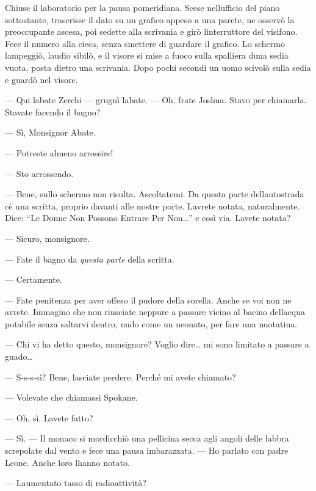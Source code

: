 	Chiuse il laboratorio per la pausa pomeridiana. Scese
	nell\textquotesingle ufficio del piano sottostante, trascrisse il dato
	su un grafico appeso a una parete, ne osservò la preoccupante ascesa,
	poi sedette alla scrivania e girò l\textquotesingle interruttore del
	visifono. Fece il numero alla cieca, senza smettere di guardare il
	grafico. Lo schermo lampeggiò, l\textquotesingle audio sibilò, e il
	visore si mise a fuoco sulla spalliera d\textquotesingle una sedia
	vuota, posta dietro una scrivania. Dopo pochi secondi un uomo scivolò
	sulla sedia e guardò nel visore.
	
	--- Qui l\textquotesingle abate Zerchi --- grugnì
	l\textquotesingle abate. --- Oh, frate Joshua. Stavo per chiamarla.
	Stavate facendo il bagno?
	
	--- Sì, Monsignor Abate.
	
	--- Potreste almeno arrossire!
	
	--- Sto arrossendo.
	
	--- Bene, sullo schermo non risulta. Ascoltatemi. Da questa parte
	dell\textquotesingle autostrada c\textquotesingle è una scritta, proprio
	davanti alle nostre porte. L\textquotesingle avrete notata,
	naturalmente. Dice: ``Le Donne Non Possono Entrare Per Non\ldots'' e
	così via. L\textquotesingle avete notata?
	
	--- Sicuro, monsignore.
	
	--- Fate il bagno da \emph{questa parte} della scritta.
	
	--- Certamente.
	
	--- Fate penitenza per aver offeso il pudore della sorella. Anche se voi
	non ne avrete. Immagino che non riusciate neppure a passare vicino al
	bacino dell\textquotesingle acqua potabile senza saltarvi dentro, nudo
	come un neonato, per fare una nuotatina.
	
	--- Chi vi ha detto questo, monsignore? Voglio dire\ldots{} mi sono
	limitato a passare a guado\ldots{}
	
	--- S-s-s-sì? Bene, lasciate perdere. Perché mi avete chiamato?
	
	--- Volevate che chiamassi Spokane.
	
	--- Oh, sì. L\textquotesingle avete fatto?
	
	--- Sì. --- Il monaco si mordicchiò una pellicina secca agli angoli
	delle labbra screpolate dal vento e fece una pausa imbarazzata. --- Ho
	parlato con padre Leone. Anche loro l\textquotesingle hanno notato.
	
	--- L\textquotesingle aumentato tasso di radioattività?
	
